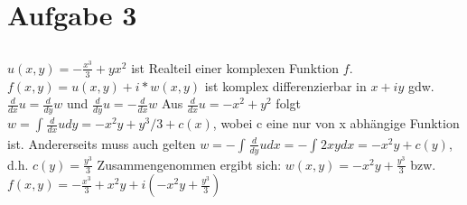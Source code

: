 \documentclass[11pt,a4paper]{scrartcl}
\begin{document}
	\section{Aufgabe 3}
	
	\subsection{}
	$u(x,y)=-\frac{x^3}{3}+y x^2 $ ist Realteil einer komplexen Funktion $f$.\newline
	$f(x,y)=u(x,y)+i*w(x,y)$ ist komplex differenzierbar in $x+iy$ gdw. $\frac{d}{dx}u = \frac{d}{dy}w$ und $\frac{d}{dy}u = -\frac{d}{dx}w$\newline
	Aus $\frac{d}{dx}u = -x^2+y^2$ folgt $w=\int_{}{} \frac{d}{dx} u dy =-x^2y+y^3/3+c(x)$, wobei c eine nur von x abhängige Funktion ist.\newline
    Andererseits muss auch gelten $w=-\int_{}{} \frac{d}{dy} u dx= -\int_{}{} 2xy  dx =-x^2y+c(y)$, d.h. $c(y)=\frac{y^3}{3}$\newline
	Zusammengenommen ergibt sich:
	    $w(x,y)=-x^2y+\frac{y^3}{3}$ bzw. $f(x,y)=-\frac{x^3}{3}+ x^2y +i(-x^2y+\frac{y^3}{3})$
\end{document}
